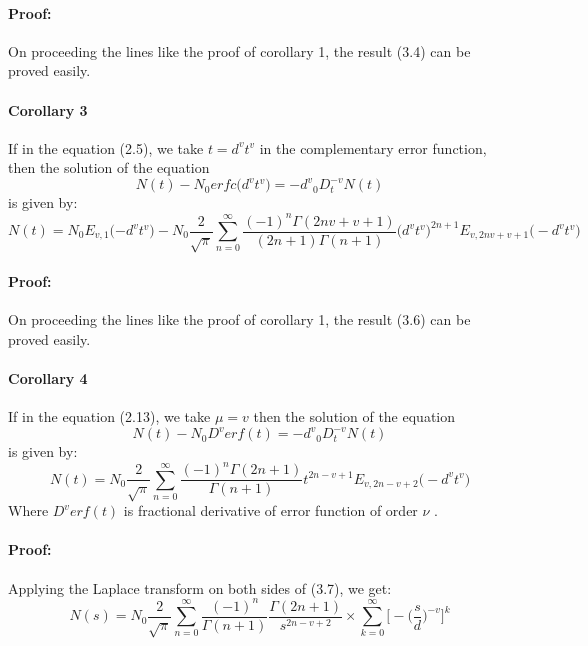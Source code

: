 \documentclass[leqno]{article}
\begin{document}
\paragraph{Proof:}
On proceeding the lines like the proof of corollary 1, the result (3.4) can be proved easily.

\paragraph{Corollary 3}
If in the equation (2.5), we take $t = {d^v}{t^v}$ in the complementary error function, then the solution of the equation
\begin{equation}
    N(t) -{N_0}erfc\big({d^v}{t^v}\big)= {-d^v}{_0D_t^{-v}}N(t)
\end{equation}
is given by: 
\begin{equation}
    N(t) =
    {N_0}E_{v,1}{\big({-d^v}{t^v}\big)} 
    -N_0
    \frac{2}{\sqrt{\pi}}
    \sum_{n = 0}^{\infty}
    \frac{{(-1)^n}\Gamma{(2nv+v+1)}}{(2n+1)\Gamma{(n+1)}}
    \big({d^v}{t^v}\big)^{2n+1}
    E_{v,2nv+v+1}
    \big(-{d^v}{t^v}\big)
\end{equation}
\paragraph{Proof:}
On proceeding the lines like the proof of corollary 1, the result (3.6) can be proved easily.

\paragraph{Corollary 4}
If in the equation (2.13), we take $\mu = v$ then the solution of the equation
\begin{equation}
    N(t) -{N_0}{D^v}erf(t)= {-d^v}{_0D_t^{-v}}N(t)
\end{equation}
is given by: 
\begin{equation}
    N(t) =
    N_0{\frac{2}{\sqrt{\pi}}}
    \sum_{n = 0}^{\infty}
    \frac{(-1)^n\Gamma{(2n+1)}}{\Gamma{(n+1)}}
    t^{2n-{v}+1}
    E_{v, 2n-{v}+2}
    \big(-{d^v}{t^v})
\end{equation}
Where ${D^v}erf(t)$ is fractional derivative of error function of order $\nu$ .\\ 
\paragraph{Proof:}
Applying the Laplace transform on both sides of (3.7), we get:\\ 
\begin{equation*}
    N(s) = N_0
    {\frac{2}{\sqrt{\pi}}}
    \sum_{n = 0}^{\infty}
    \frac{(-1)^n}{\Gamma{(n+1)}}
    \frac{\Gamma{(2n+1)}}{s^{2n- v +2}}
    \times
    \sum_{k=0}^{\infty}
    \bigg[
        -{\bigg(\frac{s}{d}\bigg)^{-v}}
    \bigg]^k
\end{equation*}
\end{document}
